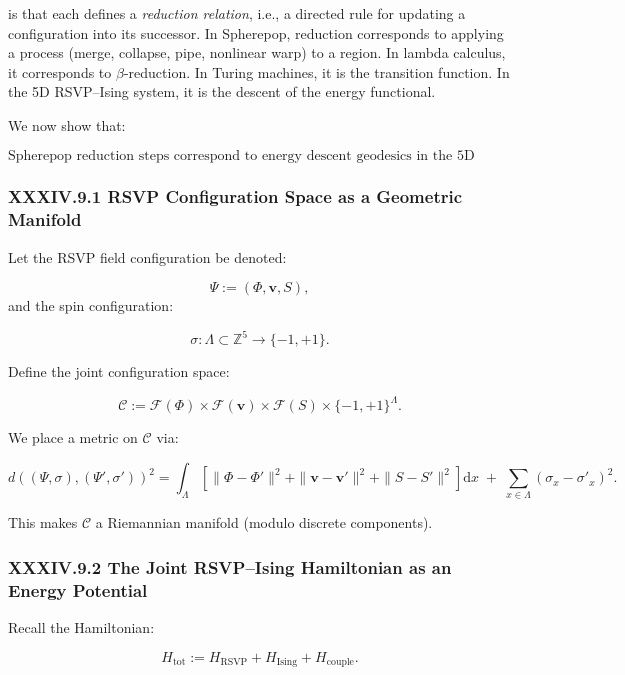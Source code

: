 \documentclass[12pt,letterpaper]{article}
\begin{document}
is that each defines a \emph{reduction relation}, i.e., a directed rule for updating a configuration into its successor. In Spherepop, reduction corresponds to applying a process (merge, collapse, pipe, nonlinear warp) to a region. In lambda calculus, it corresponds to $\beta$-reduction. In Turing machines, it is the transition function. In the 5D RSVP–Ising system, it is the descent of the energy functional.

We now show that:

\[
\boxed{
\text{Spherepop reduction steps correspond to energy descent geodesics
in the 5D RSVP--Ising manifold.}
}
\]

\subsubsection{XXXIV.9.1 RSVP Configuration Space as a Geometric Manifold}

Let the RSVP field configuration be denoted:

\[
\Psi := (\Phi, \mathbf{v}, S),
\]
and the spin configuration:

\[
\sigma : \Lambda \subset \mathbb{Z}^5 \to \{-1, +1\}.
\]

Define the joint configuration space:

\[
\mathcal{C} := \mathcal{F}(\Phi) \times \mathcal{F}(\mathbf{v}) \times \mathcal{F}(S) \times \{-1,+1\}^{\Lambda}.
\]

We place a metric on $\mathcal{C}$ via:

\[
d((\Psi,\sigma), (\Psi',\sigma'))^2
=
\int_{\Lambda}
\left[
\|\Phi-\Phi'\|^2 + \|\mathbf{v}-\mathbf{v}'\|^2 + \|S-S'\|^2
\right] \mathrm{d}x
\;+\;
\sum_{x \in \Lambda} (\sigma_x - \sigma'_x)^2.
\]

This makes $\mathcal{C}$ a Riemannian manifold (modulo discrete components).

\subsubsection{XXXIV.9.2 The Joint RSVP–Ising Hamiltonian as an Energy Potential}

Recall the Hamiltonian:

\[
H_{\text{tot}} := H_{\text{RSVP}} + H_{\text{Ising}} + H_{\text{couple}}.
\]
\end{document}
